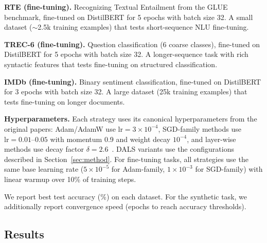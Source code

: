 \documentclass[a4paper,fleqn]{cas-dc}
\begin{document}
\textbf{RTE (fine-tuning).} Recognizing Textual Entailment from the GLUE benchmark, fine-tuned on DistilBERT for 5 epochs with batch size 32. A small dataset ($\sim$2.5k training examples) that tests short-sequence NLU fine-tuning.

\textbf{TREC-6 (fine-tuning).} Question classification (6 coarse classes), fine-tuned on DistilBERT for 5 epochs with batch size 32. A longer-sequence task with rich syntactic features that tests fine-tuning on structured classification.

\textbf{IMDb (fine-tuning).} Binary sentiment classification, fine-tuned on DistilBERT for 3 epochs with batch size 32. A large dataset (25k training examples) that tests fine-tuning on longer documents.

\textbf{Hyperparameters.} Each strategy uses its canonical hyperparameters from the original papers: Adam/AdamW use $\text{lr}=3\times10^{-4}$, SGD-family methods use $\text{lr}=0.01$--$0.05$ with momentum 0.9 and weight decay $10^{-4}$, and layer-wise methods use decay factor $\delta=2.6$~\citet{howard2018ulmfit}. DALS variants use the configurations described in Section~\ref{sec:method}. For fine-tuning tasks, all strategies use the same base learning rate ($5\times10^{-5}$ for Adam-family, $1\times10^{-3}$ for SGD-family) with linear warmup over 10\% of training steps.

We report best test accuracy (\%) on each dataset. For the synthetic task, we additionally report convergence speed (epochs to reach accuracy thresholds).

\subsection{Results}
\end{document}

